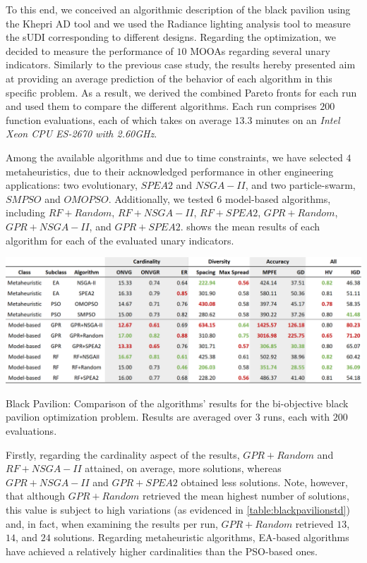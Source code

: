 To this end, we conceived an algorithmic description of the black pavilion using the Khepri \ac{AD} tool and we used the Radiance lighting analysis tool to measure the \ac{sUDI} corresponding to different designs. Regarding the optimization, we decided to measure the performance of $10$ \acp{MOOA} regarding several unary indicators. Similarly to the previous case study, the results hereby presented aim at providing an average prediction of the behavior of each algorithm in this specific problem. As a result, we derived the combined Pareto fronts for each run and used them to compare the different algorithms. Each run comprises $200$ function evaluations, each of which takes on average $13.3$ minutes on an \textit{Intel Xeon CPU ES-2670 with 2.60GHz}.

Among the available algorithms and due to time constraints, we have selected $4$ metaheuristics, due to their acknowledged performance in other engineering applications: two evolutionary, $SPEA2$ and $NSGA-II$, and two particle-swarm, $SMPSO$ and $OMOPSO$. Additionally, we tested $6$ model-based algorithms, including $RF+Random$, $RF+NSGA-II$, $RF+SPEA2$, $GPR+Random$, $GPR+NSGA-II$, and $GPR+SPEA2$.  shows the mean results of each algorithm for each of the evaluated unary indicators. 

\begin{table}[htbp]
	\centering
	\includegraphics[width=\textwidth]{Images/Evaluation/BlackPavilion/Results_Mean_20190416.PNG}
	\caption[Black Pavilion: Mean performance values of the algorithms' results]{Black Pavilion: Comparison of the algorithms' results for the bi-objective black pavilion optimization problem. Results are averaged over $3$ runs, each with $200$ evaluations.}
	\label{table:blackpavilion}
\end{table}

Firstly, regarding the cardinality aspect of the results, $GPR+Random$ and $RF+NSGA-II$ attained, on average, more solutions, whereas $GPR+NSGA-II$ and $GPR+SPEA2$ obtained less solutions. Note, however, that although $GPR+Random$ retrieved the mean highest number of solutions, this value is subject to high variations (as evidenced in \cref{table:blackpavilionstd}) and, in fact, when examining the results per run, $GPR+Random$ retrieved $13$, $14$, and $24$ solutions. Regarding metaheuristic algorithms, \ac{EA}-based algorithms have achieved a relatively higher cardinalities than the \ac{PSO}-based ones. 

